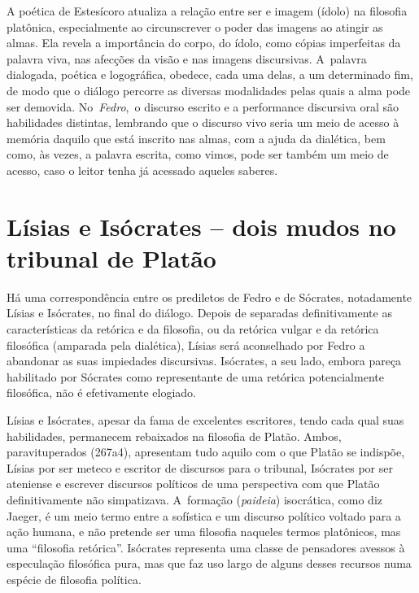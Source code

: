 A poética de Estesícoro atualiza a relação entre ser e imagem (ídolo) na
filosofia platônica, especialmente ao circunscrever o poder das imagens
ao atingir as almas. Ela revela a importância do corpo, do ídolo, como
cópias imperfeitas da palavra viva, nas afecções da visão e nas imagens
discursivas. A~palavra dialogada, poética e logográfica, obedece, cada
uma delas, a um determinado fim, de modo que o diálogo percorre as
diversas modalidades pelas quais a alma pode ser demovida.
No~\emph{Fedro},~o discurso escrito e a performance discursiva oral são
habilidades distintas, lembrando que o discurso vivo seria um meio de
acesso à memória daquilo que está inscrito nas almas, com a ajuda da
dialética, bem como, às vezes, a palavra escrita, como vimos, pode ser
também um meio de acesso, caso o leitor tenha já acessado aqueles
saberes.

 

\section{Lísias e Isócrates -- dois mudos no tribunal de Platão}

 

Há uma correspondência entre os prediletos de Fedro e de Sócrates,
notadamente Lísias e Isócrates, no final do diálogo. Depois de separadas
definitivamente as características da retórica e da filosofia, ou da
retórica vulgar e da retórica filosófica (amparada pela dialética),
Lísias será aconselhado por Fedro a abandonar as suas impiedades
discursivas. Isócrates, a seu lado, embora pareça habilitado por
Sócrates como representante de uma retórica potencialmente filosófica,
não é efetivamente elogiado.

Lísias e Isócrates, apesar da fama de excelentes escritores, tendo cada
qual suas habilidades, permanecem rebaixados na filosofia de Platão.
Ambos, paravituperados (267a4), apresentam tudo aquilo com o que Platão
se indispõe, Lísias por ser meteco e escritor de discursos para o
tribunal, Isócrates por ser ateniense e escrever discursos políticos de
uma perspectiva com que Platão definitivamente não simpatizava. A~formação
(\emph{paideia}) isocrática, como diz Jaeger, é um meio termo entre a
sofística e um discurso político voltado para a ação humana, e não
pretende ser uma filosofia naqueles termos platônicos, mas uma
``filosofia retórica''. Isócrates representa uma classe de pensadores
avessos à especulação filosófica pura, mas que faz uso largo de alguns
desses recursos numa espécie de filosofia política.

